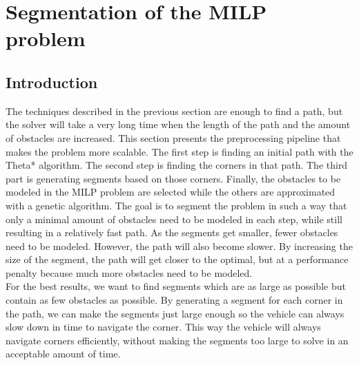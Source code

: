 \section{Segmentation of the MILP problem}
\label{section:segment}
\subsection{Introduction}
The techniques described in the previous section are enough to find a path, but the solver will take a very long time when the length of the path and the amount of obstacles are increased. This section presents the preprocessing pipeline that makes the problem more scalable. The first step is finding an initial path with the Theta* algorithm. The second step is finding the corners in that path. The third part is generating segments based on those corners. Finally, the obstacles to be modeled in the MILP problem are selected while the others are approximated with a genetic algorithm. The goal is to segment the problem in such a way that only a minimal amount of obstacles need to be modeled in each step, while still resulting in a relatively fast path. As the segments get smaller, fewer obstacles need to be modeled. However, the path will also become slower. By increasing the size of the segment, the path will get closer to the optimal, but at a performance penalty because much more obstacles need to be modeled.\\
For the best results, we want to find segments which are as large as possible but contain as few obstacles as possible. By generating a segment for each corner in the path, we can make the segments just large enough so the vehicle can always slow down in time to navigate the corner. This way the vehicle will always navigate corners  efficiently, without making the segments too large to solve in an acceptable amount of time.
